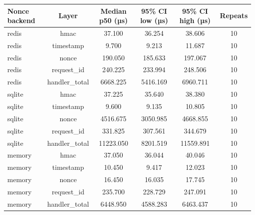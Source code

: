 \begin{table}[t]
\centering
\small
\begin{tabular}{lccccc}
\toprule
Nonce backend & Layer & Median p50 (µs) & 95\% CI low (µs) & 95\% CI high (µs) & Repeats \\
\midrule
redis & hmac & 37.100 & 36.254 & 38.606 & 10 \\
redis & timestamp & 9.700 & 9.213 & 11.687 & 10 \\
redis & nonce & 190.050 & 185.633 & 197.067 & 10 \\
redis & request\_id & 240.225 & 233.994 & 248.506 & 10 \\
redis & handler\_total & 6668.225 & 5416.169 & 6960.711 & 10 \\
sqlite & hmac & 37.225 & 35.640 & 38.380 & 10 \\
sqlite & timestamp & 9.600 & 9.135 & 10.805 & 10 \\
sqlite & nonce & 4516.675 & 3050.985 & 4668.855 & 10 \\
sqlite & request\_id & 331.825 & 307.561 & 344.679 & 10 \\
sqlite & handler\_total & 11223.050 & 8201.519 & 11559.891 & 10 \\
memory & hmac & 37.050 & 36.044 & 40.046 & 10 \\
memory & timestamp & 10.450 & 9.417 & 12.023 & 10 \\
memory & nonce & 16.450 & 16.035 & 17.745 & 10 \\
memory & request\_id & 235.700 & 228.729 & 247.091 & 10 \\
memory & handler\_total & 6448.950 & 4588.283 & 6463.437 & 10 \\
\bottomrule
\end{tabular}
\end{table}
